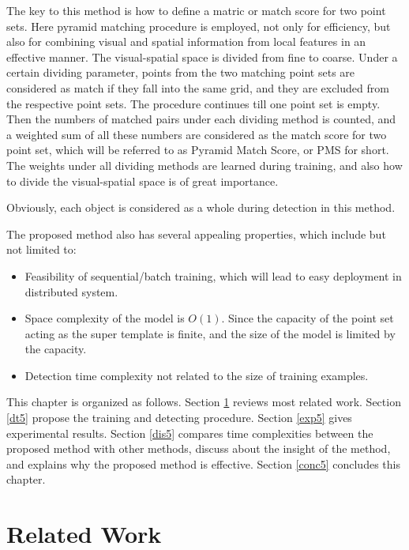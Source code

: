  The key to this method is how to define a matric or match score for two point sets. Here pyramid matching procedure is employed, not only for efficiency, but also for combining visual and spatial information from local features in an effective manner. The visual-spatial space is divided from fine to coarse. Under a certain dividing parameter, points from the two matching point sets are considered as match if they fall into the same grid, and they are excluded from the respective point sets. The procedure continues till one point set is empty. Then the numbers of matched pairs under each dividing method is counted, and a weighted sum of all these numbers are considered as the match score for two point set, which will be referred to as Pyramid Match Score, or PMS for short. The weights under all dividing methods are learned during training, and also how to divide the visual-spatial space is of great importance.

Obviously, each object is considered as a whole during detection in this method.

The proposed method also has several appealing properties, which include but not limited to:
\begin{itemize}
\item {Feasibility of sequential/batch training, which will lead to easy deployment in distributed system.}
\item {Space complexity of the model is $O(1)$. Since the capacity of the point set acting as the super template is finite, and the size of the model is limited by the capacity.}
\item {Detection time complexity not related to the size of training examples.}
\end{itemize}

This chapter is organized as follows. Section \ref{rw5} reviews most related work. Section \ref{dt5} propose the training and detecting procedure. Section \ref{exp5} gives experimental results. Section \ref{dis5} compares time complexities between the proposed method with other methods, discuss about the insight of the method, and explains why the proposed method is effective. Section \ref{conc5} concludes this chapter.

\section{Related Work}
\label{rw5}


